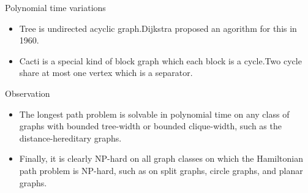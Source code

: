 \begin{frame}{Polynomial time variations}
    \centering
    \begin{itemize}
        \item <1> Tree is undirected acyclic graph.Dijkstra proposed an agorithm for this in 1960.
        \item <2>Cacti is a special kind of block graph which each block is a cycle.Two cycle share at most one vertex which is a separator.
    \end{itemize}
\end{frame}
\begin{frame}{Observation}
    \begin{itemize}
        \item The longest path problem is solvable in polynomial time 
on any class of graphs with bounded tree-width or bounded clique-width, 
such as the distance-hereditary graphs.
        \item Finally, it is clearly NP-hard 
on all graph classes on which the Hamiltonian path problem is NP-hard, 
such as on split graphs, circle graphs, and planar graphs.
    \end{itemize}
    
\end{frame}

